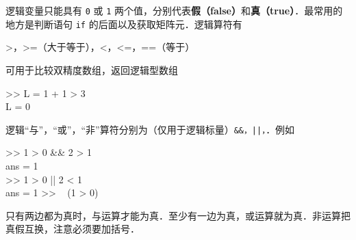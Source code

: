 逻辑变量只能具有 \texttt{0} 或 \texttt{1} 两个值，分别代表\textbf{假（false）}和\textbf{真（true）}．最常用的地方是判断语句 \texttt{if} 的后面以及获取矩阵元．逻辑算符有
\begin{Command}
>，>=（大于等于），<，<=，==（等于）
\end{Command}
可用于比较双精度数组，返回逻辑型数组
\begin{Command}
>> L = 1 + 1 > 3 \\
L = 0
\end{Command}
逻辑“与”，“或”，“非”算符分别为（仅用于逻辑标量）\texttt{\&\&，||，\texttilde}．例如
\begin{Command}
>> 1 > 0 \&\& 2 > 1 \\
ans = 1 \\
>> 1 > 0 || 2 < 1 \\
ans = 1
>> ~ (1 > 0)
\end{Command}
只有两边都为真时，与运算才能为真．至少有一边为真，或运算就为真．非运算把真假互换，注意必须要加括号．

